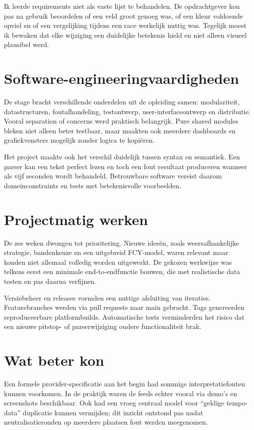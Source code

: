 Ik leerde requirements niet als vaste lijst te behandelen. De opdrachtgever kon pas na gebruik beoordelen of een veld groot genoeg was, of een kleur voldoende opviel en of een vergelijking tijdens een race werkelijk nuttig was. Tegelijk moest ik bewaken dat elke wijziging een duidelijke betekenis hield en niet alleen visueel plausibel werd.

\section{Software-engineeringvaardigheden}
De stage bracht verschillende onderdelen uit de opleiding samen: modulariteit, datastructuren, foutafhandeling, testontwerp, user-interfaceontwerp en distributie. Vooral separation of concerns werd praktisch belangrijk. Pure shared modules bleken niet alleen beter testbaar, maar maakten ook meerdere dashboards en grafiekvensters mogelijk zonder logica te kopiëren.

Het project maakte ook het verschil duidelijk tussen syntax en semantiek. Een parser kan een tekst perfect lezen en toch een fout resultaat produceren wanneer  als vijf seconden wordt behandeld. Betrouwbare software vereist daarom domeinconstraints en tests met betekenisvolle voorbeelden.

\section{Projectmatig werken}
De zes weken dwongen tot prioritering. Nieuwe ideeën, zoals weersafhankelijke strategie, bandenkeuze en een uitgebreid FCY-model, waren relevant maar konden niet allemaal volledig worden uitgewerkt. De gekozen werkwijze was telkens eerst een minimale end-to-endfunctie bouwen, die met realistische data testen en pas daarna verfijnen.

Versiebeheer en releases vormden een nuttige afsluiting van iteraties. Featurebranches werden via pull requests naar main gebracht. Tags genereerden reproduceerbare platformbuilds. Automatische tests verminderden het risico dat een nieuwe pitstop- of parserwijziging oudere functionaliteit brak.

\section{Wat beter kon}
Een formele provider-specificatie aan het begin had sommige interpretatiefouten kunnen voorkomen. In de praktijk waren de feeds echter vooral via demo's en screenshots beschikbaar. Ook had een vroeg centraal model voor ``geldige tempo-data'' duplicatie kunnen vermijden; dit inzicht ontstond pas nadat neutralisatieronden op meerdere plaatsen fout werden meegenomen.

